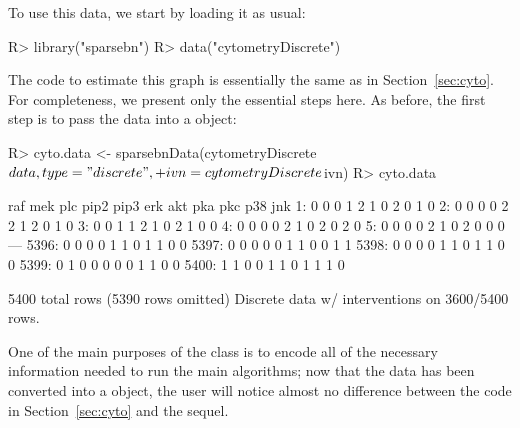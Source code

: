 \documentclass[article]{jss}
\renewcommand{\|}{\,|\,}
\begin{document}
To use this data, we start by loading it as usual:
%
\begin{CodeChunk}
\begin{CodeInput}
R> library("sparsebn")
R> data("cytometryDiscrete")
\end{CodeInput}
\end{CodeChunk}
%
The code to estimate this graph is essentially the same as in Section~\ref{sec:cyto}. For completeness, we present only the essential steps here. As before, the first step is to pass the data into a  object:
%
\begin{CodeChunk}
\begin{CodeInput}
R> cyto.data <- sparsebnData(cytometryDiscrete$data, type = "discrete",
+    ivn = cytometryDiscrete$ivn)
R> cyto.data
\end{CodeInput}
\begin{CodeOutput}
      raf mek plc pip2 pip3 erk akt pka pkc p38 jnk
   1:   0   0   0    1    2   1   0   2   0   1   0
   2:   0   0   0    0    2   2   1   2   0   1   0
   3:   0   0   1    1    2   1   0   2   1   0   0
   4:   0   0   0    0    2   1   0   2   0   2   0
   5:   0   0   0    0    2   1   0   2   0   0   0
  ---                                              
5396:   0   0   0    0    1   1   0   1   1   0   0
5397:   0   0   0    0    0   1   1   0   0   1   1
5398:   0   0   0    0    1   1   0   1   1   0   0
5399:   0   1   0    0    0   0   0   1   1   0   0
5400:   1   1   0    0    1   1   0   1   1   1   0

5400 total rows (5390 rows omitted)
Discrete data w/ interventions on 3600/5400 rows.
\end{CodeOutput}
\end{CodeChunk}
%
One of the main purposes of the  class is to encode all of the necessary information needed to run the main algorithms; now that the data has been converted into a  object, the user will notice almost no difference between the code in Section~\ref{sec:cyto} and the sequel.
\end{document}
